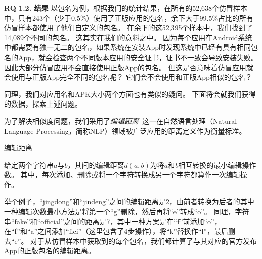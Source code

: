 {\bf RQ 1.2. 结果}
以包名为例，根据我们的统计结果，在所有的52,638个仿冒样本中，只有243个（少于0.5\%）使用了正版应用的包名，余下大于99.5\%占比的所有仿冒样本都使用了他们自定义的包名。
在余下的这52,395个样本中，我们找到了14,089个不同的包名。
这其实在我们的意料之中。
因为每个应用在Android系统中都需要有独一无二的包名，如果系统在安装App时发现系统中已经有具有相同包名的App，就会检查两个不同版本应用的安全证书，证书不一致会导致安装失败。
因此大部分仿冒应用不会直接使用正版App的包名。
但这是否意味着仿冒应用就会使用与正版App完全不同的包名呢？
它们会不会使用和正版App相似的包名？

同理，我们对应用名和APK大小两个方面也有类似的疑问。
下面将会就我们获得的数据，探索上述问题。

为了解决相似度问题，我们采用了\textit{编辑距离}~\cite{levenshtein1966binary}这一在自然语言处理（Natural Language Processing，简称NLP）领域被广泛应用的距离定义作为衡量标准。

\begin{Def}
	编辑距离

	给定两个字符串$a$与$b$，其间的编辑距离$d(a, b)$为将$a$和$b$相互转换的最小编辑操作数。
	其中，每次添加、删除或将一个字符转换成另一个字符都算作一次编辑操作。
\end{Def}

举个例子，``jingdong''和``jindeng''之间的编辑距离是2，由前者转换为后者的其中一种编辑次数最小方法是将第一个``g''删除，然后再将``e''转成``o''。
同理，字符串``fake''和``official''之间的距离是7，其中一种方案是在``f''前添加``o''，在``f''和``a''之间添加``fici''（这里包含了4步操作），将``k''替换作``l''，最后删去``e''。
对于从仿冒样本中获取到的每个包名，我们都计算了与其对应的官方发布App的正版包名的编辑距离。


